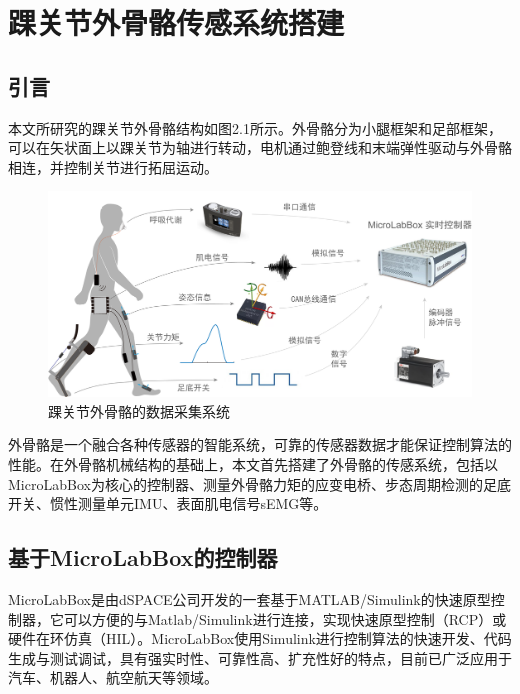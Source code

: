 \chapter{踝关节外骨骼传感系统搭建}

\section{引言}
本文所研究的踝关节外骨骼结构如图2.1所示。外骨骼分为小腿框架和足部框架，可以在矢状面上以踝关节为轴进行转动，电机通过鲍登线和末端弹性驱动与外骨骼相连，并控制关节进行拓屈运动。
\begin{figure}[htb]
    \includegraphics[width=17cm]{fig/f27.png}
    \caption{踝关节外骨骼的数据采集系统}
    \label{fig:mark}
\end{figure}

外骨骼是一个融合各种传感器的智能系统，可靠的传感器数据才能保证控制算法的性能。在外骨骼机械结构的基础上，本文首先搭建了外骨骼的传感系统，包括以MicroLabBox为核心的控制器、测量外骨骼力矩的应变电桥、步态周期检测的足底开关、惯性测量单元IMU、表面肌电信号sEMG等。

\section{基于MicroLabBox的控制器}

MicroLabBox是由dSPACE公司开发的一套基于MATLAB/Simulink的快速原型控制器，它可以方便的与Matlab/Simulink进行连接，实现快速原型控制（RCP）或硬件在环仿真（HIL）。MicroLabBox使用Simulink进行控制算法的快速开发、代码生成与测试调试，具有强实时性、可靠性高、扩充性好的特点，目前已广泛应用于汽车、机器人、航空航天等领域。


